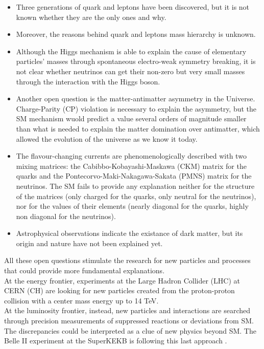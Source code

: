 \begin{itemize}
\item Three generations of quark and leptons have been discovered, but it is not known whether they are the only ones and why.
\item Moreover, the reasons behind quark and leptons mass hierarchy is unknown.
\item Although the Higgs mechanism is able to explain the cause of elementary particles' masses through spontaneous electro-weak symmetry breaking, it is not clear whether neutrinos can get their non-zero but very small masses through the interaction with the Higgs boson.
\item Another open question is the matter-antimatter asymmetry in the Universe. Charge-Parity (CP) violation is necessary to explain the asymmetry, but the SM mechanism wuold predict a value several orders of magnitude smaller than what is needed to explain the matter domination over antimatter, which allowed the evolution of the universe as we know it today.
\item The flavour-changing currents are phenomenologically described with two mixing matrices: the Cabibbo-Kobayashi-Maskawa (CKM) matrix for the quarks and the Pontecorvo-Maki-Nakagawa-Sakata (PMNS) matrix for the neutrinos. The SM fails to provide any explanation neither for the structure of the matrices (only charged for the quarks, only neutral for the neutrinos), nor for the values of their elements (nearly diagonal for the quarks, highly non diagonal for the neutrinos).
\item Astrophysical observations indicate the existance of dark matter, but its origin and nature have not been explained yet.
\end{itemize}

All these open questions stimulate the research for new particles and processes that could provide more fundamental explanations.\\
At the energy frontier, experiments at the Large Hadron Collider (LHC) at CERN (CH) are looking for new particles created from the proton-proton collision with a center mass energy up to 14 TeV.\\
At the luminosity frontier, instead, new particles and interactions are searched through precision measurements of suppressed reactions or deviations from SM. The discrepancies could be interpreted as a clue of new physics beyond SM. The Belle II experiment at the SuperKEKB is following this last approach .\\


